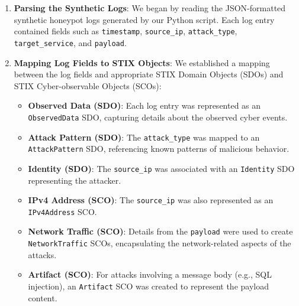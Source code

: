 \documentclass[conference]{IEEEtran}
\begin{document}
\begin{enumerate}
    \item \textbf{Parsing the Synthetic Logs}: We began by reading the JSON-formatted synthetic honeypot logs generated by our Python script. Each log entry contained fields such as \texttt{timestamp}, \texttt{source\_ip}, \texttt{attack\_type}, \texttt{target\_service}, and \texttt{payload}.

    \item \textbf{Mapping Log Fields to STIX Objects}: We established a mapping between the log fields and appropriate STIX Domain Objects (SDOs) and STIX Cyber-observable Objects (SCOs):
    \begin{itemize}
        \item \textbf{Observed Data (SDO)}: Each log entry was represented as an \texttt{ObservedData} SDO, capturing details about the observed cyber events.
        \item \textbf{Attack Pattern (SDO)}: The \texttt{attack\_type} was mapped to an \texttt{AttackPattern} SDO, referencing known patterns of malicious behavior.
        \item \textbf{Identity (SDO)}: The \texttt{source\_ip} was associated with an \texttt{Identity} SDO representing the attacker.
        \item \textbf{IPv4 Address (SCO)}: The \texttt{source\_ip} was also represented as an \texttt{IPv4Address} SCO.
        \item \textbf{Network Traffic (SCO)}: Details from the \texttt{payload} were used to create \texttt{NetworkTraffic} SCOs, encapsulating the network-related aspects of the attacks.
        \item \textbf{Artifact (SCO)}: For attacks involving a message body (e.g., SQL injection), an \texttt{Artifact} SCO was created to represent the payload content.
    \end{itemize}


\end{enumerate}
\end{document}
